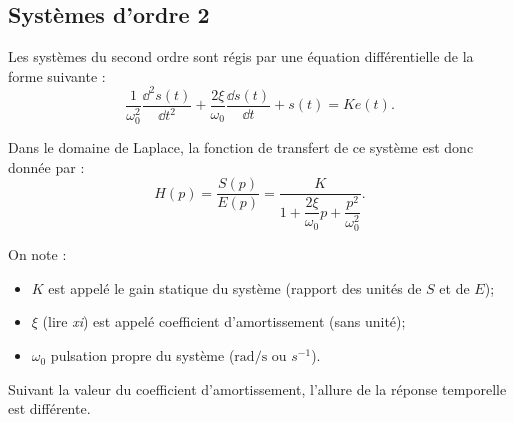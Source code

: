 \subsection{Systèmes d'ordre 2}


\begin{marginfigure}
\end{marginfigure}

\begin{defi}
Les systèmes du second ordre sont régis par une équation différentielle de la
forme suivante :
$$
\dfrac{1}{\omega_0^2} \dfrac{\dd^2 s(t)}{\dd t^2}+\dfrac{2\xi}{\omega_0} \dfrac{\dd s(t)}{\dd t}+s(t) = Ke(t).
$$

Dans le domaine de Laplace, la fonction de transfert de ce système est donc
donnée par :
$$ H(p)=\dfrac{S(p)}{E(p)} = \dfrac{K}{1+ \dfrac{2\xi}{\omega_0}p+\dfrac{p^2}{\omega_0^2}}. $$


On note :
\begin{itemize}
\item $K$ est appelé le gain statique du système (rapport des unités de $S$ et de $E$);
\item $\xi$ (lire \textit{xi}) est appelé coefficient d'amortissement (sans unité);
\item $\omega_0$ pulsation propre du système ($\text{rad/s}$ ou $s^{-1}$).
\end{itemize}

Suivant la valeur du coefficient d'amortissement, l'allure de la réponse temporelle est différente.
\end{defi}


